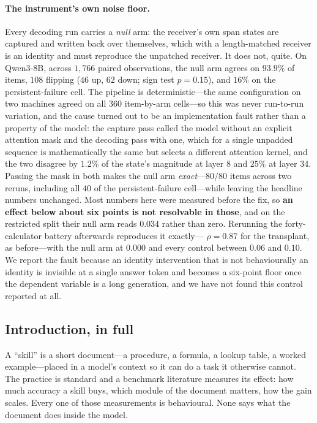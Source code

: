 \documentclass{article}
\begin{document}
\paragraph{The instrument's own noise floor.} Every decoding run carries a
\emph{null} arm: the receiver's own span states are captured and written back
over themselves, which with a length-matched receiver is an identity and must
reproduce the unpatched receiver. It does not, quite. On Qwen3-8B, across
$1{,}766$ paired observations, the null arm agrees on $93.9\%$ of items, $108$
flipping ($46$ up, $62$ down; sign test $p = 0.15$), and $16\%$ on the
persistent-failure cell. The
pipeline is deterministic---the same configuration on two machines agreed on all
$360$ item-by-arm cells---so this was never run-to-run variation, and the cause
turned out to be an implementation fault rather than a property of the model:
the capture pass called the model without an explicit attention mask and the
decoding pass with one, which for a single unpadded sequence is mathematically
the same but selects a different attention kernel, and the two disagree by
$1.2\%$ of the state's magnitude at layer 8 and $25\%$ at layer 34. Passing the
mask in both makes the null arm \emph{exact}---$80/80$ items across two reruns,
including all $40$ of the persistent-failure cell---while leaving the headline
numbers unchanged. Most numbers here were measured before the fix,
so \textbf{an effect below about six points is not resolvable in those}, and
on the restricted split their null arm reads $0.034$ rather than zero.
Rerunning the forty-calculator battery afterwards reproduces it exactly---
$\rho = 0.87$ for the transplant, as before---with the null arm at $0.000$ and
every control between $0.06$ and $0.10$. We report the fault because an
identity intervention that is not
behaviourally an identity is invisible at a single answer token and becomes a
six-point floor once the dependent variable is a long generation, and we have
not found this control reported at all.




\subsection{Introduction, in full}
\label{app:intro}

A ``skill'' is a short document---a procedure, a formula, a lookup table, a
worked example---placed in a model's context so it can do a task it otherwise
cannot. The practice is standard and a benchmark literature measures its effect:
how much accuracy a skill buys, which module of the document matters, how the
gain scales. Every one of those measurements is behavioural. None says what the
document does inside the model.
\end{document}
